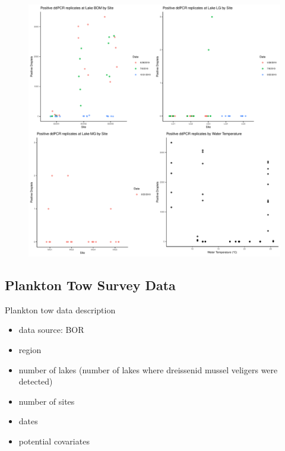 \documentclass[12pt]{article}\usepackage[]{graphicx}\usepackage[]{color}
\makeatletter
\def\maxwidth{ %
  \ifdim\Gin@nat@width>\linewidth
    \linewidth
  \else
    \Gin@nat@width
  \fi
}
\newenvironment{knitrout}{}{} %
\def\maxwidth{ %
  \ifdim\Gin@nat@width>\linewidth
    \linewidth
  \else
    \Gin@nat@width
  \fi
}
\newenvironment{knitrout}{}{} %
\makeatother
\begin{document}
\begin{knitrout}
\color{fgcolor}\begin{figure}

{\centering \includegraphics[width=\maxwidth]{figure/eDNA_visualization-1} 

}

\end{figure}


\end{knitrout}

\subsection{Plankton Tow Survey Data}

Plankton tow data description
\begin{itemize}
  \item data source: BOR
  \item region
  \item number of lakes (number of lakes where dreissenid mussel veligers were detected)
  \item number of sites
  \item dates
  \item potential covariates
\end{itemize}
\end{document}
